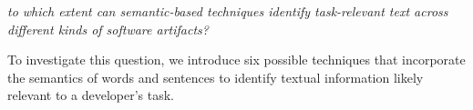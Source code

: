



\medskip
\begin{bluequote}
    \textit{to which extent can semantic-based techniques identify task-relevant text across different kinds of software artifacts?}
\end{bluequote}




To investigate this question, we introduce six possible techniques that incorporate the  
semantics of words and sentences to identify textual information likely relevant to a developer's task.












